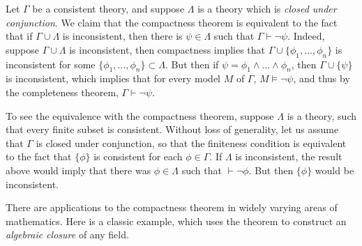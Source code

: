\begin{remark}
    Let $\Gamma$ be a consistent theory, and suppose $\Lambda$ is a theory which is \emph{closed under conjunction}. We claim that the compactness theorem is equivalent to the fact that if $\Gamma \cup \Lambda$ is inconsistent, then there is $\psi \in \Lambda$ such that $\Gamma \vdash \neg \psi$. Indeed, suppose $\Gamma \cup \Lambda$ is inconsistent, then compactness implies that $\Gamma \cup \{ \phi_1, \dots, \phi_n \}$ is inconsistent for some $\{ \phi_1, \dots, \phi_n \} \subset \Lambda$. But then if $\psi = \phi_1 \wedge \dots \wedge \phi_n$, then $\Gamma \cup \{ \psi \}$ is inconsistent, which implies that for every model $M$ of $\Gamma$, $M \vDash \neg \psi$, and thus by the completeness theorem, $\Gamma \vdash \neg \psi$. 

    To see the equivalence with the compactness theorem, suppose $\Lambda$ is a theory, such that every finite subset is consistent. Without loss of generality, let us assume that $\Gamma$ is closed under conjunction, so that the finiteness condition is equivalent to the fact that $\{ \phi \}$ is consistent for each $\phi \in \Gamma$. If $\Lambda$ is inconsistent, the result above would imply that there was $\phi \in \Lambda$ such that $\vdash \neg \phi$. But then $\{ \phi \}$ would be inconsistent.
\end{remark}

There are applications to the compactness theorem in widely varying areas of mathematics. Here is a classic example, which uses the theorem to construct an \emph{algebraic closure} of any field.

